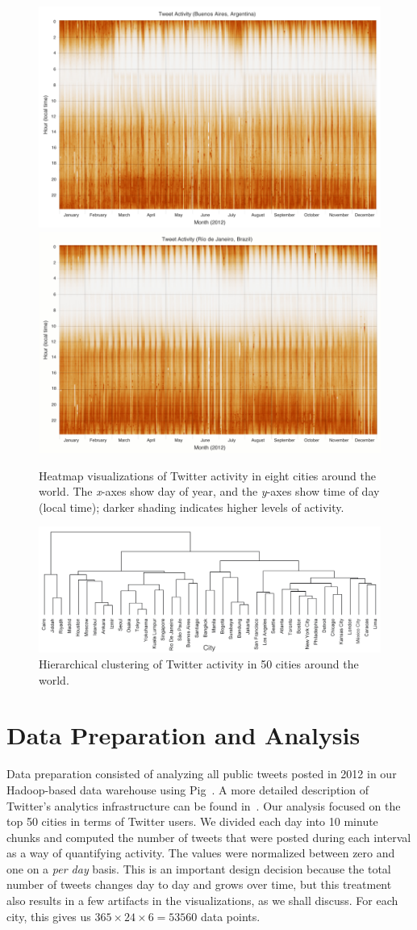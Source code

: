 \documentclass[letterpaper]{article}
\begin{document}
\begin{figure}[p]
\includegraphics[width=0.45\linewidth]{heatmap_imgs/buenosaires.png}
\includegraphics[width=0.45\linewidth]{heatmap_imgs/rio.png}
\caption{Heatmap visualizations of Twitter activity in eight cities around the world. The
  {\it x}-axes show day of year, and the {\it y}-axes show time of day (local time);
  darker shading indicates higher levels of activity.}
\label{viz:cities}
\end{figure}

\begin{figure}[t]
\centering
\includegraphics[width=0.95\linewidth]{dendrograms/dendogram_50_bottom_clean_shorter.png}
\caption{Hierarchical clustering of Twitter activity in 50 cities around the world.}
\label{viz:dendrogram}
\end{figure}

\section{Data Preparation and Analysis}

Data preparation consisted of analyzing all public tweets posted in
2012 in our Hadoop-based data warehouse using Pig~\cite{Olston_etal_SIGMOD2008}. A more
detailed description of Twitter's analytics infrastructure can be found
in~\cite{Lin_Kolcz_SIGMOD2012}. Our analysis focused on the top 50
cities in terms of Twitter users. We divided each day into 10 minute
chunks and computed the number of tweets that were posted during each
interval as a way of quantifying activity. The values were normalized
between zero and one on a {\it per day} basis. This is an important
design decision because the total number of tweets changes day to day
and grows over time, but this treatment also results in a few
artifacts in the visualizations, as we shall discuss. For each city,
this gives us $365 \times 24 \times 6 = 53560$ data points.
\end{document}
